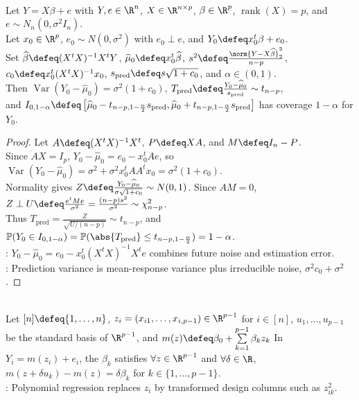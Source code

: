 \begin{corollary} \label{cor:linear-model-prediction-interval} \\
Let $Y=X\beta+e$ with $Y,e\in\R^n$, $X\in\R^{n\times p}$, $\beta\in\R^p$, $\operatorname{rank}(X)=p$, and $e\sim N_n(0,\sigma^2I_n)$.\\
Let $x_0\in\R^p$, $e_0\sim N(0,\sigma^2)$ with $e_0\perp e$, and $Y_0\defeq x_0^t\beta+e_0$.\\
Set $\widehat{\beta}\defeq(X^tX)^{-1}X^tY$, $\widehat{\mu}_0\defeq x_0^t\widehat{\beta}$, $s^2\defeq\frac{\norm{Y-X\widehat{\beta}}_2^2}{n-p}$, $c_0\defeq x_0^t(X^tX)^{-1}x_0$, $s_{\operatorname{pred}}\defeq s\sqrt{1+c_0}$, and $\alpha\in(0,1)$.\\
Then $\operatorname{Var}(Y_0-\widehat{\mu}_0)=\sigma^2(1+c_0)$, $T_{\operatorname{pred}}\defeq\frac{Y_0-\widehat{\mu}_0}{s_{\operatorname{pred}}}\sim t_{n-p}$,\\
and $I_{0,1-\alpha}\defeq\left[\widehat{\mu}_0-t_{n-p,1-\frac{\alpha}{2}}s_{\operatorname{pred}},\widehat{\mu}_0+t_{n-p,1-\frac{\alpha}{2}}s_{\operatorname{pred}}\right]$ has coverage $1-\alpha$ for $Y_0$.
\begin{proof} Let $A\defeq(X^tX)^{-1}X^t$, $P\defeq XA$, and $M\defeq I_n-P$.\\
Since $AX=I_p$, $Y_0-\widehat{\mu}_0=e_0-x_0^tAe$, so $\operatorname{Var}(Y_0-\widehat{\mu}_0)=\sigma^2+\sigma^2x_0^tAA^tx_0=\sigma^2(1+c_0)$.\\
Normality gives $Z\defeq\frac{Y_0-\widehat{\mu}_0}{\sigma\sqrt{1+c_0}}\sim N(0,1)$. Since $AM=0$, $Z\perp U\defeq\frac{e^tMe}{\sigma^2}=\frac{(n-p)s^2}{\sigma^2}\sim\chi^2_{n-p}$.\\
Thus $T_{\operatorname{pred}}=\frac{Z}{\sqrt{U/(n-p)}}\sim t_{n-p}$, and $\mathbb{P}(Y_0\in I_{0,1-\alpha})=\mathbb{P}(\abs{T_{\operatorname{pred}}}\le t_{n-p,1-\frac{\alpha}{2}})=1-\alpha$.\\
: $Y_0-\widehat{\mu}_0=e_0-x_0^t(X^tX)^{-1}X^te$ combines future noise and estimation error.\\
: Prediction variance is mean-response variance plus irreducible noise, $\sigma^2c_0+\sigma^2$.
\end{proof}
\end{corollary}

\begin{definition} \label{def:multiple-linear-regression-coefficients} \\
Let $[n]\defeq\{1,\ldots,n\}$, $z_i=(x_{i1},\ldots,x_{i,p-1})\in\R^{p-1}$ for $i\in[n]$, $u_1,\ldots,u_{p-1}$ be the standard basis of $\R^{p-1}$, and $m(z)\defeq\beta_0+\sum\limits_{k=1}^{p-1}\beta_kz_k$ In $Y_i=m(z_i)+e_i$, the  $\beta_k$ satisfies $\forall z\in\R^{p-1}$ and $\forall\delta\in\R$, $m(z+\delta u_k)-m(z)=\delta\beta_k$ for $k\in\{1,\ldots,p-1\}$.\\
: Polynomial regression replaces $z_i$ by transformed design columns such as $z_{ik}^2$.
\end{definition}

